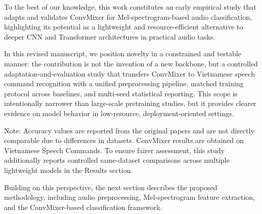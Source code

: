 To the best of our knowledge, this work constitutes an early empirical study that adapts and validates ConvMixer for Mel-spectrogram-based audio classification, highlighting its potential as a lightweight and resource-efficient alternative to deeper CNN and Transformer architectures in practical audio tasks.

In this revised manuscript, we position novelty in a constrained and testable manner: the contribution is not the invention of a new backbone, but a controlled adaptation-and-evaluation study that transfers ConvMixer to Vietnamese speech command recognition with a unified preprocessing pipeline, matched training protocol across baselines, and multi-seed statistical reporting.
This scope is intentionally narrower than large-scale pretraining studies, but it provides clearer evidence on model behavior in low-resource, deployment-oriented settings.

\begin{table}[h!]
\centering
\caption{Comparison of representative architectures in audio and vision-audio classification tasks.}
\label{tab:comparison_models}
\end{table}

{\footnotesize
Note: Accuracy values are reported from the original papers and are not directly comparable due to differences in datasets. ConvMixer results are obtained on Vietnamese Speech Commands. To ensure fairer assessment, this study additionally reports controlled same-dataset comparisons across multiple lightweight models in the Results section.
}

\vspace{1pt}

Building on this perspective, the next section describes the proposed methodology, including audio preprocessing, Mel-spectrogram feature extraction, and the ConvMixer-based classification framework.
